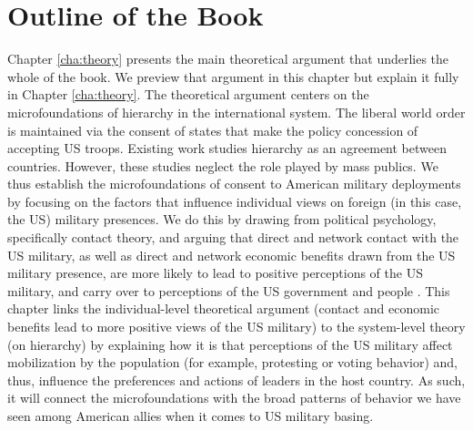 \section*{Outline of the Book}
Chapter \ref{cha:theory} presents the main theoretical argument that underlies the whole of the book. We preview that argument in this chapter but explain it fully in Chapter \ref{cha:theory}. The theoretical argument centers on the microfoundations of hierarchy in the international system. The liberal world order is maintained via the consent of states that make the policy concession of accepting US troops. Existing work studies hierarchy as an agreement between countries. However, these studies neglect the role played by mass publics. We thus establish the microfoundations of consent to American military deployments by focusing on the factors that influence individual views on foreign (in this case, the US) military presences. We do this by drawing from political psychology, specifically contact theory, and arguing that direct and network contact with the US military, as well as direct and network economic benefits drawn from the US military presence, are more likely to lead to positive perceptions of the US military, and carry over to perceptions of the US government and people \cite{Pettigrew1998,Woolcock2000,Putnam2001,Huckfeldt2001}. This chapter links the individual-level theoretical argument (contact and economic benefits lead to more positive views of the US military) to the system-level theory (on hierarchy) by explaining how it is that perceptions of the US military affect mobilization by the population (for example, protesting or voting behavior) and, thus, influence the preferences and actions of leaders in the host country. As such, it will connect the microfoundations with the broad patterns of behavior we have seen among American allies when it comes to US military basing.

